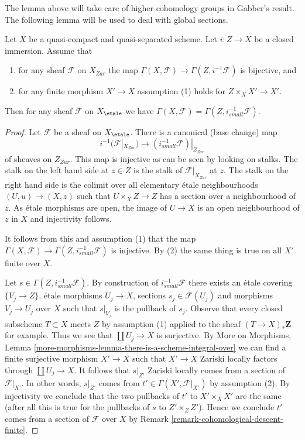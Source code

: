 \noindent
The lemma above will take care of higher cohomology groups in
Gabber's result. The following lemma will be used to deal with
global sections.

\begin{lemma}
\label{lemma-gabber-h0}
Let $X$ be a quasi-compact and quasi-separated scheme.
Let $i : Z \to X$ be a closed immersion. Assume that
\begin{enumerate}
\item for any sheaf $\mathcal{F}$ on $X_{Zar}$ the map
$\Gamma(X, \mathcal{F}) \to \Gamma(Z, i^{-1}\mathcal{F})$
is bijective, and
\item for any finite morphism $X' \to X$ assumption (1) holds
for $Z \times_X X' \to X'$.
\end{enumerate}
Then for any sheaf $\mathcal{F}$ on $X_\etale$ we have
$\Gamma(X, \mathcal{F}) = \Gamma(Z, i^{-1}_{small}\mathcal{F})$.
\end{lemma}

\begin{proof}
Let $\mathcal{F}$ be a sheaf on $X_\etale$. There is a canonical
(base change) map
$$
i^{-1}(\mathcal{F}|_{X_{Zar}})
\longrightarrow
(i_{small}^{-1}\mathcal{F})|_{Z_{Zar}}
$$
of sheaves on $Z_{Zar}$. This map is injective as can be seen by looking
on stalks. The stalk on the left hand side at $z \in Z$
is the stalk of $\mathcal{F}|_{X_{Zar}}$ at $z$. The stalk on the right
hand side is the colimit over all elementary \'etale neighbourhoods
$(U, u) \to (X, z)$ such that $U \times_X Z \to Z$ has a section over
a neighbourhood of $z$. As \'etale morphisms are open, the image of
$U \to X$ is an open neighbourhood of $z$ in $X$ and injectivity follows.

\medskip\noindent
It follows from this and assumption (1) that the map
$\Gamma(X, \mathcal{F}) \to \Gamma(Z, i^{-1}_{small}\mathcal{F})$
is injective. By (2) the same thing is true on all $X'$ finite over $X$.

\medskip\noindent
Let $s \in \Gamma(Z, i^{-1}_{small}\mathcal{F})$. By construction of
$i^{-1}_{small}\mathcal{F}$ there exists an \'etale covering
$\{V_j \to Z\}$, \'etale morphisms $U_j \to X$, sections
$s_j \in \mathcal{F}(U_j)$ and morphisms $V_j \to U_j$ over $X$
such that $s|_{V_j}$ is the pullback of $s_j$.
Observe that every closed subscheme $T \subset X$ meets $Z$
by assumption (1) applied to the sheaf $(T \to X)_*\underline{\mathbf{Z}}$
for example. Thus we see that $\coprod U_j \to X$ is surjective.
By More on Morphisms, Lemma
\ref{more-morphisms-lemma-there-is-a-scheme-integral-over}
we can find a finite surjective morphism $X' \to X$
such that $X' \to X$ Zariski locally factors through $\coprod U_j \to X$.
It follows that $s|_{Z'}$ Zariski locally comes
from a section of $\mathcal{F}|_{X'}$. In other words,
$s|_{Z'}$ comes from $t' \in \Gamma(X', \mathcal{F}|_{X'})$
by assumption (2).
By injectivity we conclude that the two pullbacks of $t'$ to
$X' \times_X X'$ are the same (after all this is true for
the pullbacks of $s$ to $Z' \times_Z Z'$). Hence we conclude
$t'$ comes from a section of $\mathcal{F}$ over $X$ by
Remark \ref{remark-cohomological-descent-finite}.
\end{proof}

